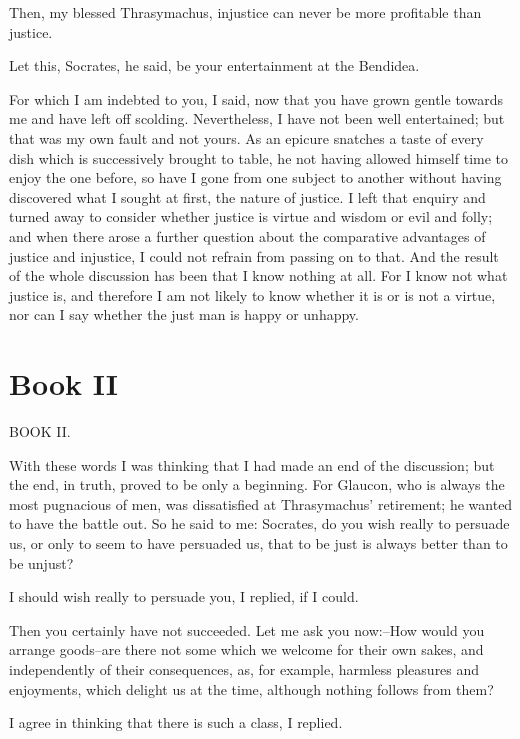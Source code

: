 Then, my blessed Thrasymachus, injustice can never be more profitable
than justice.

Let this, Socrates, he said, be your entertainment at the Bendidea.

For which I am indebted to you, I said, now that you have grown gentle
towards me and have left off scolding. Nevertheless, I have not been
well entertained; but that was my own fault and not yours. As an epicure
snatches a taste of every dish which is successively brought to table,
he not having allowed himself time to enjoy the one before, so have I
gone from one subject to another without having discovered what I sought
at first, the nature of justice. I left that enquiry and turned away
to consider whether justice is virtue and wisdom or evil and folly; and
when there arose a further question about the comparative advantages of
justice and injustice, I could not refrain from passing on to that. And
the result of the whole discussion has been that I know nothing at all.
For I know not what justice is, and therefore I am not likely to know
whether it is or is not a virtue, nor can I say whether the just man is
happy or unhappy.


\section{Book II} %
\label{sec:book_ii}



BOOK II.

With these words I was thinking that I had made an end of the
discussion; but the end, in truth, proved to be only a beginning. For
Glaucon, who is always the most pugnacious of men, was dissatisfied at
Thrasymachus' retirement; he wanted to have the battle out. So he said
to me: Socrates, do you wish really to persuade us, or only to seem to
have persuaded us, that to be just is always better than to be unjust?

I should wish really to persuade you, I replied, if I could.

Then you certainly have not succeeded. Let me ask you now:--How would
you arrange goods--are there not some which we welcome for their
own sakes, and independently of their consequences, as, for example,
harmless pleasures and enjoyments, which delight us at the time,
although nothing follows from them?

I agree in thinking that there is such a class, I replied.

